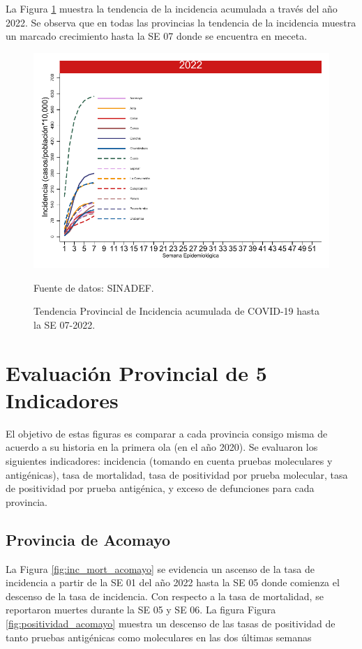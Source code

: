\documentclass[12pt,a4paper,openany]{book}
\begin{document}
La Figura \ref{fig:incidencia_provincial} muestra la tendencia de la incidencia acumulada a través del año 2022. Se observa que en todas las provincias la tendencia de la incidencia muestra un marcado crecimiento hasta la SE 07 donde se encuentra en meceta. 
%
\begin{figure}[h]
	\caption{Tendencia Provincial de Incidencia acumulada de COVID-19 hasta la SE 07-2022. }\label{fig:incidencia_provincial}
	\begin{center}
		\includegraphics[width=0.65\linewidth]{../figuras/incidencia_provincial_2022.pdf}
	\end{center}
	{\footnotesize {Fuente de datos: SINADEF.}}
\end{figure}

\clearpage
	
\section*{Evaluación Provincial de 5 Indicadores}
		\noindent El objetivo de estas figuras es comparar a cada provincia consigo misma de acuerdo a su historia  en la primera ola (en el año 2020). Se evaluaron los siguientes indicadores: incidencia (tomando en cuenta pruebas moleculares y antigénicas), tasa de mortalidad, tasa de positividad por prueba molecular, tasa de positividad por prueba antigénica, y exceso de defunciones para cada provincia.
		
		\subsection*{Provincia de Acomayo}
		\noindent La Figura \ref{fig:inc_mort_acomayo} se evidencia un ascenso de la tasa de incidencia a partir de la SE 01 del año 2022 hasta la SE 05 donde comienza el descenso de la tasa de incidencia. Con respecto a la tasa de mortalidad, se reportaron muertes durante la SE 05 y SE 06. 
		\noindent La figura Figura \ref{fig:positividad_acomayo} muestra un descenso de las tasas de positividad de tanto pruebas antigénicas como moleculares en las dos últimas semanas
		
\end{document}
